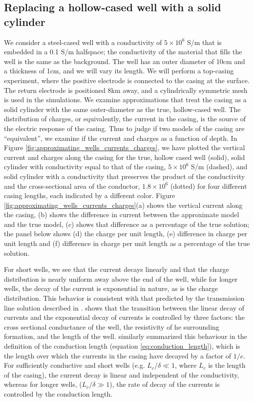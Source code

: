 \subsection{Replacing a hollow-cased well with a solid cylinder}
We consider a steel-cased well with a conductivity of $5\times10^6$ S/m that is embedded in a 0.1 S/m halfspace; the conductivity of the material that fills the well is the same as the background. The well has an outer diameter of 10cm and a thickness of 1cm, and we will vary its length. We will perform a top-casing experiment, where the positive electrode is connected to the casing at the surface. The return electrode is positioned 8km away, and a cylindrically symmetric mesh is used in the simulations. We examine approximations that treat the casing as a solid cylinder with the same outer-diameter as the true, hollow-cased well. The distribution of charges, or equivalently, the current in the casing, is the source of the electric response of the casing. Thus to judge if two models of the casing are ``equivalent'', we examine if the current and charges as a function of depth. In Figure \ref{fig:approximating_wells_currents_charges}, we have plotted the vertical current and charges along the casing for the true, hollow cased well (solid), solid cylinder with conductivity equal to that of the casing, $5 \times 10^6$ S/m (dashed), and solid cylinder with a conductivity that preserves the product of the conductivity and the cross-sectional area of the conductor, $1.8 \times 10^6$ (dotted) for four different casing lengths, each indicated by a different color. Figure \ref{fig:approximating_wells_currents_charges}(a) shows the vertical current along the casing, (b) shows the difference in current between the approximate model and the true model, (c) shows that difference as a percentage of the true solution; the panel below shows (d) the charge per unit length, (e) difference in charge per unit length and (f) difference in charge per unit length as a percentage of the true solution.




For short wells, we see that the current decays linearly and that the charge distribution is nearly uniform away above the end of the well, while for longer wells, the decay of the current is exponential in nature, as is the charge distribution. This behavior is consistent with that predicted by the transmission line solution described in \cite{Kaufman1993}. \cite{Kaufman1993} shows that the transition between the linear decay of currents and the exponential decay of currents is controlled by three factors: the cross sectional conductance of the well, the resistivity of he surrounding formation, and the length of the well. \cite{Schenkel1991} similarly summarized this behaviour in the definition of the conduction length (equation \ref{eq:conduction_length}), which is the length over which the currents in the casing have decayed by a factor of $1/e$. For sufficiently conductive and short wells (e.g. $L_c / \delta \ll 1$, where $L_c$ is the length of the casing), the current decay is linear and independent of the conductivity, whereas for longer wells, ($L_c / \delta \gg 1$), the rate of decay of the currents is controlled by the conduction length.

